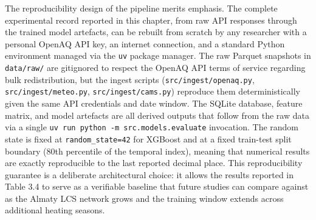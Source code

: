 The reproducibility design of the pipeline merits emphasis. The complete experimental record reported in this chapter, from raw API responses through the trained model artefacts, can be rebuilt from scratch by any researcher with a personal OpenAQ API key, an internet connection, and a standard Python environment managed via the \texttt{uv} package manager. The raw Parquet snapshots in \texttt{data/raw/} are gitignored to respect the OpenAQ API terms of service regarding bulk redistribution, but the ingest scripts (\texttt{src/ingest/openaq.py}, \texttt{src/ingest/meteo.py}, \texttt{src/ingest/cams.py}) reproduce them deterministically given the same API credentials and date window. The SQLite database, feature matrix, and model artefacts are all derived outputs that follow from the raw data via a single \texttt{uv\ run\ python\ -m\ src.models.evaluate} invocation. The random state is fixed at \texttt{random\_state=42} for XGBoost and at a fixed train-test split boundary (80th percentile of the temporal index), meaning that numerical results are exactly reproducible to the last reported decimal place. This reproducibility guarantee is a deliberate architectural choice: it allows the results reported in Table 3.4 to serve as a verifiable baseline that future studies can compare against as the Almaty LCS network grows and the training window extends across additional heating seasons.
